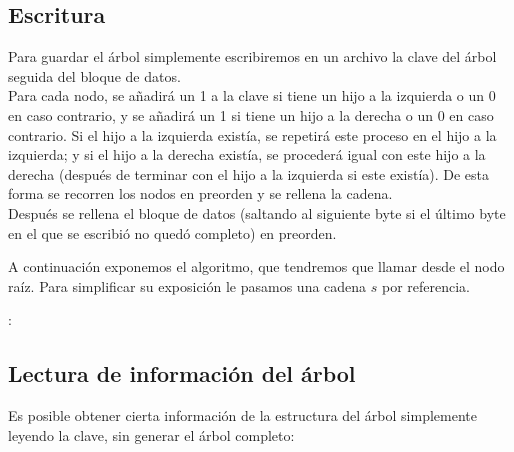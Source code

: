 \documentclass{article}
\newenvironment{algo}{
\vspace*{0.5cm}
\begin{algorithm}[H]}{
\end{algorithm}
\vspace*{0.5cm}
}
\begin{document}
\subsection{Escritura}

Para guardar el árbol simplemente escribiremos en un archivo la clave del árbol
seguida del bloque de datos. \\

Para cada nodo, se añadirá un 1 a la clave si tiene un hijo a la izquierda o un 0
en caso contrario, y se añadirá un 1 si tiene un hijo a la derecha o un 0 en caso
contrario. Si el hijo a la izquierda existía, se repetirá este proceso en el hijo
a la izquierda; y si el hijo a la derecha existía, se procederá igual con este hijo
a la derecha (después de terminar con el hijo a la izquierda si este existía). De
esta forma se recorren los nodos en preorden y se rellena la cadena. \\

Después se rellena el bloque de datos (saltando al siguiente byte si el último
byte en el que se escribió no quedó completo) en preorden.

A continuación exponemos el algoritmo, que tendremos que llamar desde el nodo
raíz. Para simplificar su exposición le pasamos una cadena $s$ por referencia.

\begin{algo}
: \\

\BlankLine


\BlankLine


\end{algo}

\subsection{Lectura de información del árbol}

Es posible obtener cierta información de la estructura del árbol simplemente
leyendo la clave, sin generar el árbol completo:
\end{document}
